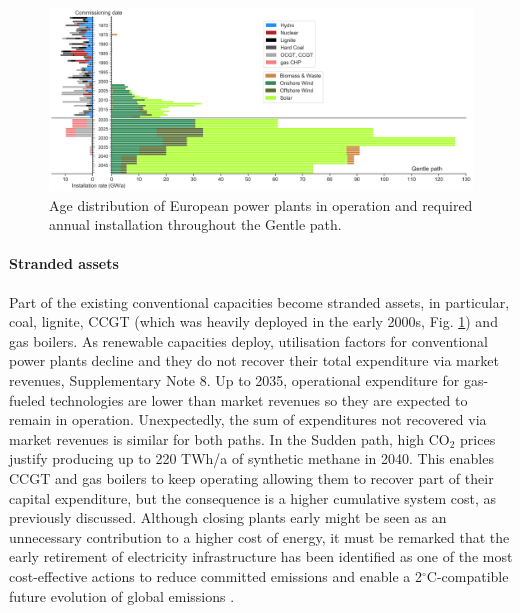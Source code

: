\documentclass[5p]{elsarticle} %
\begin{document}
\begin{figure}[!h]
\centering
\includegraphics[width=\textwidth]{figures/age_distribution_Base_Gentle.png}
\caption{Age distribution of European power plants in operation \cite{powerplantmatching, IRENA_2019} and required annual installation throughout the Gentle path.} \label{fig_age_distribution} 
\end{figure}

\paragraph{\textbf{Stranded assets}} Part of the existing conventional capacities become stranded assets, in particular, coal, lignite, CCGT (which was heavily deployed in the early 2000s, Fig. \ref{fig_age_distribution}) and gas boilers. As renewable capacities deploy, utilisation factors for conventional power plants decline and they do not recover their total expenditure via market revenues, Supplementary Note 8. Up to 2035, operational expenditure for gas-fueled technologies are lower than market revenues so they are expected to remain in operation. Unexpectedly, the sum of expenditures not recovered via market revenues is similar for both paths. In the Sudden path, high CO$_2$ prices justify producing up to 220 TWh/a of synthetic methane in 2040. This enables CCGT and gas boilers to keep operating allowing them to recover part of their capital expenditure, but the consequence is a higher cumulative system cost, as previously discussed. Although closing plants early might be seen as an unnecessary contribution to a higher cost of energy, it must be remarked that the early retirement of electricity infrastructure has been identified as one of the most cost-effective actions to reduce committed emissions and enable a 2$^{\circ}$C-compatible future evolution of global emissions \cite{Tong_2019}.
\end{document}
